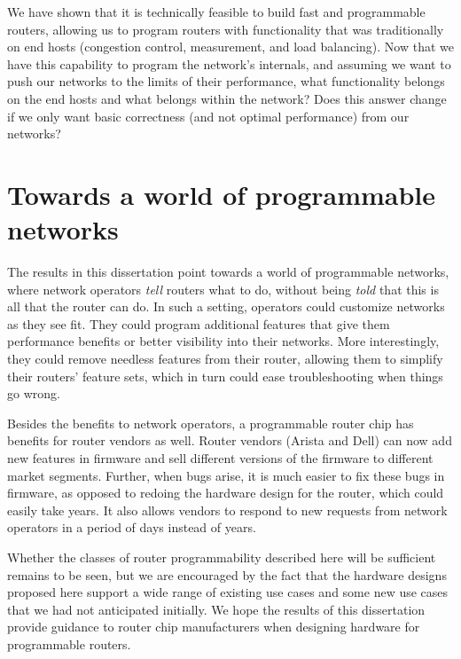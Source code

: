  We have shown
that it is technically feasible to build fast and programmable routers,
allowing us to program routers with functionality that was traditionally on end
hosts (\eg congestion control, measurement, and load balancing). Now that we
have this capability to program the network's internals, and assuming we want
to push our networks to the limits of their performance, what functionality
belongs on the end hosts and what belongs within the network?  Does this answer
change if we only want basic correctness (and not optimal performance) from our
networks?

\section{Towards a world of programmable networks}

The results in this dissertation point towards a world of programmable
networks, where network operators \textit{tell} routers what to do, without
being \textit{told} that this is all that the router can do. In such a setting,
operators could customize networks as they see fit.  They could program
additional features that give them performance benefits or better visibility
into their networks.  More interestingly, they could remove needless features
from their router, allowing them to simplify their routers' feature sets, which
in turn could ease troubleshooting when things go wrong.

Besides the benefits to network operators, a programmable router chip has
benefits for router vendors as well. Router vendors (\eg Arista and Dell) can
now add new features in firmware and sell different versions of the firmware to
different market segments. Further, when bugs arise, it is much easier to fix
these bugs in firmware, as opposed to redoing the hardware design for the
router, which could easily take years. It also allows vendors to respond to new
requests from network operators in a period of days instead of years.

Whether the classes of router programmability described here will be sufficient
remains to be seen, but we are encouraged by the fact that the hardware designs
proposed here support a wide range of existing use cases and some new use cases
that we had not anticipated initially. We hope the results of this dissertation
provide guidance to router chip manufacturers when designing hardware for
programmable routers.
